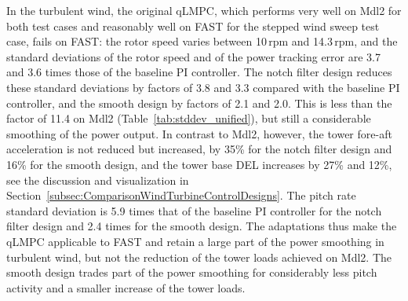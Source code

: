 In the turbulent wind, the original qLMPC, which performs very well on Mdl2 for both test cases and reasonably well on FAST for the stepped wind sweep test case, fails on FAST: the rotor speed varies between 10\,rpm and 14.3\,rpm, and the standard deviations of the rotor speed and of the power tracking error are 3.7 and 3.6 times those of the baseline PI controller. The notch filter design reduces these standard deviations by factors of 3.8 and 3.3 compared with the baseline PI controller, and the smooth design by factors of 2.1 and 2.0. This is less than the factor of 11.4 on Mdl2 (Table~\ref{tab:stddev_unified}), but still a considerable smoothing of the power output. In contrast to Mdl2, however, the tower fore-aft acceleration is not reduced but increased, by 35\% for the notch filter design and 16\% for the smooth design, and the tower base DEL increases by 27\% and 12\%, see the discussion and visualization in Section~\ref{subsec:ComparisonWindTurbineControlDesigns}. The pitch rate standard deviation is 5.9 times that of the baseline PI controller for the notch filter design and 2.4 times for the smooth design. The adaptations thus make the qLMPC applicable to FAST and retain a large part of the power smoothing in turbulent wind, but not the reduction of the tower loads achieved on Mdl2. The smooth design trades part of the power smoothing for considerably less pitch activity and a smaller increase of the tower loads.

